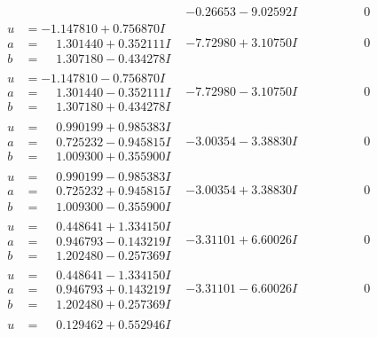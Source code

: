 \documentclass[1p]{elsarticle_modified}
\theoremstyle{definition}
\begin{document}
$$\begin{array}{c|c|c}
 & -0.26653 - 9.02592 I & \phantom{-0.000000 } 0 \\ \hline\begin{aligned}
u &= -1.147810 + 0.756870 I \\
a &= \phantom{-}1.301440 + 0.352111 I \\
b &= \phantom{-}1.307180 - 0.434278 I\end{aligned}
 & -7.72980 + 3.10750 I & \phantom{-0.000000 } 0 \\ \hline\begin{aligned}
u &= -1.147810 - 0.756870 I \\
a &= \phantom{-}1.301440 - 0.352111 I \\
b &= \phantom{-}1.307180 + 0.434278 I\end{aligned}
 & -7.72980 - 3.10750 I & \phantom{-0.000000 } 0 \\ \hline\begin{aligned}
u &= \phantom{-}0.990199 + 0.985383 I \\
a &= \phantom{-}0.725232 - 0.945815 I \\
b &= \phantom{-}1.009300 + 0.355900 I\end{aligned}
 & -3.00354 - 3.38830 I & \phantom{-0.000000 } 0 \\ \hline\begin{aligned}
u &= \phantom{-}0.990199 - 0.985383 I \\
a &= \phantom{-}0.725232 + 0.945815 I \\
b &= \phantom{-}1.009300 - 0.355900 I\end{aligned}
 & -3.00354 + 3.38830 I & \phantom{-0.000000 } 0 \\ \hline\begin{aligned}
u &= \phantom{-}0.448641 + 1.334150 I \\
a &= \phantom{-}0.946793 - 0.143219 I \\
b &= \phantom{-}1.202480 - 0.257369 I\end{aligned}
 & -3.31101 + 6.60026 I & \phantom{-0.000000 } 0 \\ \hline\begin{aligned}
u &= \phantom{-}0.448641 - 1.334150 I \\
a &= \phantom{-}0.946793 + 0.143219 I \\
b &= \phantom{-}1.202480 + 0.257369 I\end{aligned}
 & -3.31101 - 6.60026 I & \phantom{-0.000000 } 0 \\ \hline\begin{aligned}
u &= \phantom{-}0.129462 + 0.552946 I \\

\end{aligned}
\end{array}$$
\end{document}
